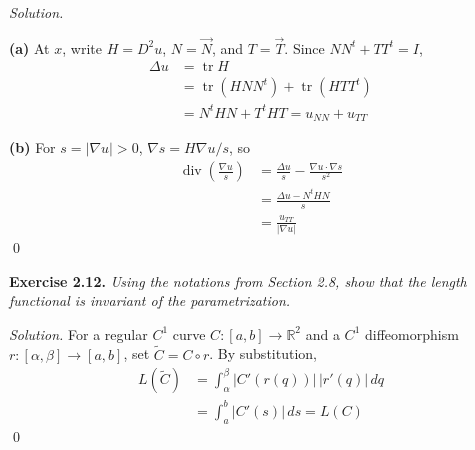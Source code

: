 \documentclass[12pt,letterpaper]{article}
\newcommand{\R}{\mathbb R}
\newcommand{\diver}{\operatorname{div}}
\newcommand{\exercise}[1]{%
  \par\bigskip\noindent\textbf{Exercise #1.}\enspace}
\newenvironment{statement}{\itshape\ignorespaces}{\par}
\newcommand{\solution}{\par\medskip\noindent\textit{Solution.}\enspace}
\newcommand{\partlabel}[1]{\par\medskip\noindent\textbf{(#1)}\enspace}
\newcommand{\finish}{\qed\par}
\begin{document}
\solution
\partlabel{a} At $x$, write $H=D^2u$, $N=\vec N$, and $T=\vec T$.
Since $NN^t+TT^t=I$,
\begin{align*}
 \Delta u&=\operatorname{tr}H\\
 &=\operatorname{tr}(HNN^t)+\operatorname{tr}(HTT^t)\\
 &=N^tHN+T^tHT=u_{NN}+u_{TT}
\end{align*}

\partlabel{b} For $s=|\nabla u|>0$, $\nabla s=H\nabla u/s$, so
\begin{align*}
 \diver\left(\frac{\nabla u}{s}\right)
 &=\frac{\Delta u}{s}-\frac{\nabla u\cdot\nabla s}{s^2}\\
 &=\frac{\Delta u-N^tHN}{s}\\
 &=\frac{u_{TT}}{|\nabla u|}
\end{align*}
\finish


\begin{samepage}
\exercise{2.12}
\begin{statement}
Using the notations from Section 2.8, show that the length functional is invariant of the parametrization.
\end{statement}
\end{samepage}
\solution
For a regular $C^1$ curve $C:[a,b]\to\R^2$ and a $C^1$
diffeomorphism $r:[\alpha,\beta]\to[a,b]$, set $\widetilde C=C\circ r$.
By substitution,
\begin{align*}
 L(\widetilde C)
 &=\int_\alpha^\beta|C'(r(q))|\,|r'(q)|\,dq\\
 &=\int_a^b|C'(s)|\,ds=L(C)
\end{align*}
\finish
\end{document}
